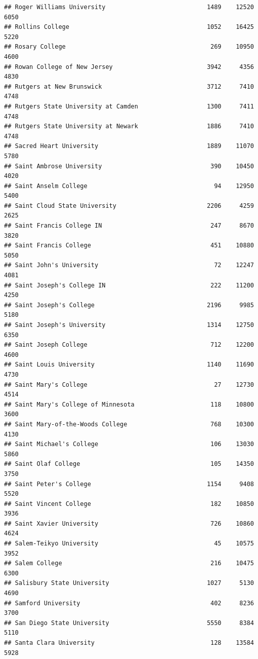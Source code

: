 \documentclass[
]{article}
\begin{document}
\begin{verbatim}
## Roger Williams University                            1489    12520       6050
## Rollins College                                      1052    16425       5220
## Rosary College                                        269    10950       4600
## Rowan College of New Jersey                          3942     4356       4830
## Rutgers at New Brunswick                             3712     7410       4748
## Rutgers State University at Camden                   1300     7411       4748
## Rutgers State University at Newark                   1886     7410       4748
## Sacred Heart University                              1889    11070       5780
## Saint Ambrose University                              390    10450       4020
## Saint Anselm College                                   94    12950       5400
## Saint Cloud State University                         2206     4259       2625
## Saint Francis College IN                              247     8670       3820
## Saint Francis College                                 451    10880       5050
## Saint John's University                                72    12247       4081
## Saint Joseph's College IN                             222    11200       4250
## Saint Joseph's College                               2196     9985       5180
## Saint Joseph's University                            1314    12750       6350
## Saint Joseph College                                  712    12200       4600
## Saint Louis University                               1140    11690       4730
## Saint Mary's College                                   27    12730       4514
## Saint Mary's College of Minnesota                     118    10800       3600
## Saint Mary-of-the-Woods College                       768    10300       4130
## Saint Michael's College                               106    13030       5860
## Saint Olaf College                                    105    14350       3750
## Saint Peter's College                                1154     9408       5520
## Saint Vincent College                                 182    10850       3936
## Saint Xavier University                               726    10860       4624
## Salem-Teikyo University                                45    10575       3952
## Salem College                                         216    10475       6300
## Salisbury State University                           1027     5130       4690
## Samford University                                    402     8236       3700
## San Diego State University                           5550     8384       5110
## Santa Clara University                                128    13584       5928

\end{verbatim}
\end{document}

